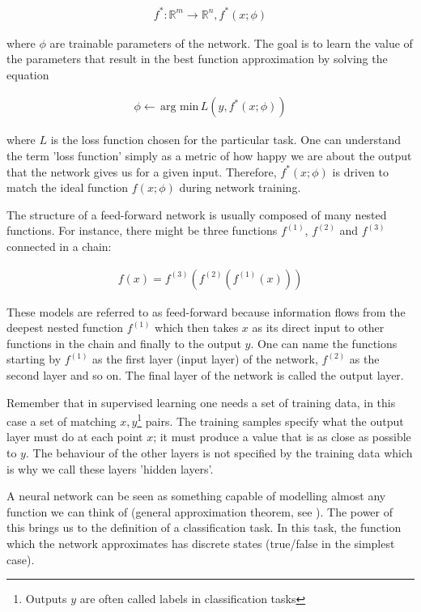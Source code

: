 \begin{gather}
f^*: \mathbb{R}^m \rightarrow \mathbb{R}^n, f^*(x;\phi)
\end{gather}

\noindent where $ \phi $ are trainable parameters of the network. The goal is to learn the value of the parameters that result in the best function approximation by solving the equation \cite{santiago}

\begin{gather}
\phi \leftarrow \, \text{arg min} \, L(y, f^*(x;\phi))
\end{gather}

\noindent where $ L $ is the loss function chosen for the particular task. One can understand the term 'loss function' simply as a metric of how happy we are about the output that the network gives us for a given input. Therefore, $f^*(x;\phi)$ is driven to match the ideal function $f(x;\phi)$ during network training. 

The structure of a feed-forward network is usually composed of many nested functions. For instance, there might be three functions $f^{(1)}$, $f^{(2)}$ and $f^{(3)}$ connected in a chain: \cite{santiago}

\begin{gather}
f(x) = f^{(3)}(f^{(2)}(f^{(1)}(x)))
\end{gather}

These models are referred to as feed-forward because information flows from the deepest nested function $f^{(1)}$ which then takes $ x $ as its direct input to other functions in the chain and finally to the output $ y $. One can name the functions starting by $f^{(1)}$ as the first layer (input layer) of the network, $f^{(2)}$ as the second layer and so on. The final layer of the network is called the output layer. \cite{santiago}

Remember that in supervised learning one needs a set of training data, in this case a set of matching $ x, y $\footnote{Outputs $ y $ are often called labels in classification tasks}  pairs. The training samples specify what the output layer must do at each point $ x $; it must produce a value that is as close as possible to $ y $. The behaviour of the other layers is not specified by the training data which is why we call these layers 'hidden layers'. \cite{santiago}

A neural network can be seen as something capable of modelling almost any function we can think of (general approximation theorem, see \cite{goodfellow}). The power of this brings us to the definition of a classification task. In this task, the function which the network approximates has discrete states (true/false in the simplest case). 


